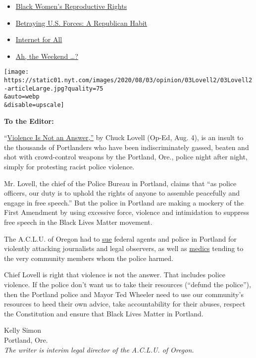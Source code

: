 \begin{itemize}
\tightlist
\item
  \protect\hyperlink{link-eafaf65}{Black Women's Reproductive Rights}
\item
  \protect\hyperlink{link-3084cc09}{Betraying U.S. Forces: A Republican
  Habit}
\item
  \protect\hyperlink{link-2254537e}{Internet for All}
\item
  \protect\hyperlink{link-510bdec2}{Ah, the Weekend \ldots?}
\end{itemize}

\texttt{[image: https://static01.nyt.com/images/2020/08/03/opinion/03Lovell2/03Lovell2-articleLarge.jpg?quality=75\\\&auto=webp\\\&disable=upscale]}

\textbf{To the Editor:}

``\href{https://www.nytimes.com/2020/08/03/opinion/portland-protests-police-chief.html}{Violence
Is Not an Answer,''} by Chuck Lovell (Op-Ed, Aug. 4), is an insult to
the thousands of Portlanders who have been indiscriminately gassed,
beaten and shot with crowd-control weapons by the Portland, Ore., police
night after night, simply for protesting racist police violence.

Mr. Lovell, the chief of the Police Bureau in Portland, claims that ``as
police officers, our duty is to uphold the rights of anyone to assemble
peacefully and engage in free speech.'' But the police in Portland are
making a mockery of the First Amendment by using excessive force,
violence and intimidation to suppress free speech in the Black Lives
Matter movement.

The A.C.L.U. of Oregon had to
\href{https://www.aclu.org/press-releases/aclu-sues-federal-agents-portland/}{sue}
federal agents and police in Portland for violently attacking
journalists and legal observers, as well as
\href{https://www.aclu.org/press-releases/aclu-sues-feds-portland-police-attacking-medics-protests}{medics}
tending to the very community members whom the police harmed.

Chief Lovell is right that violence is not the answer. That includes
police violence. If the police don't want us to take their resources
(``defund the police''), then the Portland police and Mayor Ted Wheeler
need to use our community's resources to heed their own advice, take
accountability for their abuses, respect the Constitution and ensure
that Black Lives Matter in Portland.

Kelly Simon\\
Portland, Ore.\\
\emph{The writer is interim legal director of the A.C.L.U. of Oregon.}

